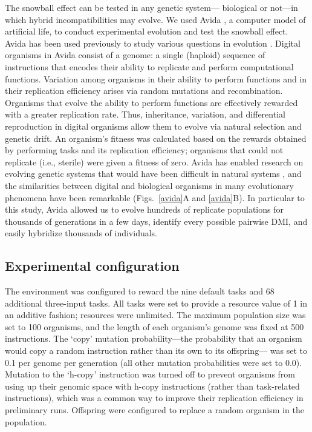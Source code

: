 \begin{doublespace}
The snowball effect can be tested in any genetic system---%
biological or not---in which hybrid incompatibilities may evolve.
%
We used Avida \citep{ofr04}, a computer model of artificial life,
to conduct experimental evolution and test the snowball effect.
%
Avida has been used previously to study various questions in evolution
\citep{len99,len03,cho04,mis06,ele07,ele08,mis10}.
%
Digital organisms in Avida consist of a genome:
a single (haploid) sequence of instructions that encodes
their ability to replicate and perform computational functions.
%
Variation among organisms in their ability to perform functions
and in their replication efficiency
arises via random mutations and recombination.
%
Organisms that evolve the ability to perform functions
are effectively rewarded with a greater replication rate.
%
Thus, inheritance, variation, and differential reproduction
in digital organisms allow them to evolve
via natural selection and genetic drift.
%
An organism's fitness was calculated based on the rewards
obtained by performing tasks and its replication efficiency;
organisms that could not replicate (i.e., sterile)
were given a fitness of zero.
%
Avida has enabled research on evolving genetic systems
that would have been difficult in natural systems \citep{ada06},
and the similarities between digital and biological organisms
in many evolutionary phenomena have been remarkable \citep{wil02,ada06}
(Figs.~\ref{avida}A and \ref{avida}B).
%
In particular to this study, Avida allowed us to evolve hundreds of
replicate populations for thousands of generations in a few days,
identify every possible pairwise DMI,
and easily hybridize thousands of individuals.



\subsection{Experimental configuration}

The environment was configured to reward the nine default tasks
and 68 additional three-input tasks.
%
All tasks were set to provide a resource value of 1 in an additive fashion;
resources were unlimited.
%
The maximum population size was set to 100 organisms,
and the length of each organism's genome was fixed at 500 instructions.
%
The `copy' mutation probability---the probability that an organism
would copy a random instruction rather than its own to its offspring---%
was set to 0.1 per genome per generation
(all other mutation probabilities were set to 0.0).
%
Mutation to the `h-copy' instruction was turned off to prevent
organisms from using up their genomic space with h-copy instructions
(rather than task-related instructions), which was a common way
to improve their replication efficiency in preliminary runs.
%
Offspring were configured to replace a random organism in the population.




\end{doublespace}
